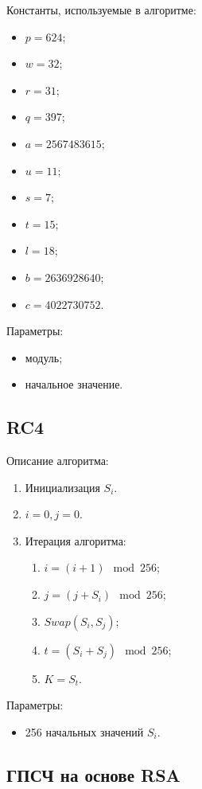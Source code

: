 \documentclass[bachelor, och, labwork]{SCWorks}
\begin{document}
Константы, используемые в алгоритме:
\begin{itemize}
  \item $p = 624$;
  \item $w = 32$;
  \item $r = 31$;
  \item $q = 397$;
  \item $a = 2567483615$;
  \item $u = 11$;
  \item $s = 7$;
  \item $t = 15$;
  \item $l = 18$;
  \item $b = 2636928640$;
  \item $c = 4022730752$.
\end{itemize}

Параметры:
\begin{itemize}
  \item модуль;
  \item начальное значение.
\end{itemize}

\subsection{RC4}
Описание алгоритма:
\begin{enumerate}
  \item Инициализация $S_i$.
  \item $i = 0, j = 0$.
  \item Итерация алгоритма:
    \begin{enumerate}
      \item $i = (i + 1) \mod 256$;
      \item $j = (j + S_i) \mod 256$;
      \item $Swap(S_i, S_j)$;
      \item $t = (S_i + S_j) \mod 256$;
      \item $K = S_t$.
    \end{enumerate}
\end{enumerate}

Параметры:
\begin{itemize}
  \item 256 начальных значений $S_i$.
\end{itemize}


\subsection{ГПСЧ на основе RSA}
\end{document}
